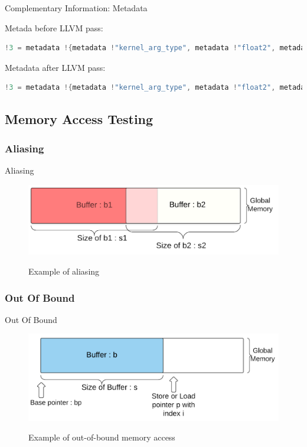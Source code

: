\documentclass{beamer}
\begin{document}
\begin{frame}[fragile]{Complementary Information: Metadata}

Metada before LLVM pass:
\begin{lstlisting}[language=C]
  !3 = metadata !{metadata !"kernel_arg_type", metadata !"float2", metadata !"float*", metadata !"float*"}
  \end{lstlisting}  

Metadata after LLVM pass:
\begin{lstlisting}[language=C]
!3 = metadata !{metadata !"kernel_arg_type", metadata !"float2", metadata !"float*", metadata !"float*", metadata !"int", metadata !"int"}
  \end{lstlisting}
  
\end{frame}

\subsection{Memory Access Testing}

\subsubsection{Aliasing}
\begin{frame}{Aliasing}
\begin{figure}[ht]
         \center
            \includegraphics[width=0.7\linewidth]{alias.png}
         \label{Pass}
         \caption{Example of aliasing}
        \end{figure}
\end{frame}

\subsubsection{Out Of Bound}
\begin{frame}{Out Of Bound}
\begin{figure}[ht]
         \center
            \includegraphics[width=0.7\linewidth]{OFB.png}
         \label{Pass}
         \caption{Example of out-of-bound memory access}
        \end{figure}
\end{frame}
\end{document}
